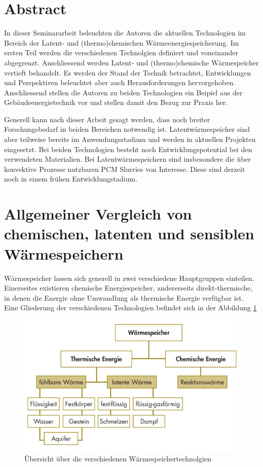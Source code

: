 \documentclass[11pt,a4paper]{scrartcl}
\begin{document}

\tableofcontents
\newpage
\renewcommand{\headrulewidth}{0.4pt}
\renewcommand{\footrulewidth}{0.4pt}
\lhead{}
\rhead{}
\cfoot{}
\setcounter{page}{1}
\cfoot{\thepage}
\section{Abstract}
In dieser Seminararbeit beleuchten die Autoren die aktuellen Technologien im
Bereich der Latent- und (thermo)chemischen Wärmeenergiespeicherung. Im ersten Teil
werden die verschiedenen Technolgien definiert und voneinander abgegrenzt.
Anschliessend werden Latent- und (thermo)chemische Wärmespeicher vertieft
behandelt. Es werden der Stand der Technik betrachtet, Entwicklungen und
Perspektiven beleuchtet aber auch Herausforderungen hervorgehoben. Anschliessend
stellen die Autoren zu beiden Technologien ein Beipiel aus der
Gebäudeenergietechnik vor und stellen damit den Bezug zur Praxis her. 

Generell kann nach dieser Arbeit gesagt werden, dass noch breiter
Forschungsbedarf in beiden Bereichen notwendig ist. Latentwärmespeicher sind aber teilweise bereits
im Anwendungsstadium und werden in aktuellen Projekten eingesetzt. Bei beiden
Technologien besteht noch Entwicklungspotential bei den verwendeten Materialien.
Bei Latentwärmespeichern sind insbesondere die über konvektive Prozesse
nutzbaren PCM Slurries von Interesse. Diese sind derzeit noch in einem frühen
Entwicklungstadium.

\newpage
\section{Allgemeiner Vergleich von chemischen, latenten und sensiblen
Wärmespeichern}
Wärmespeicher lassen sich generell in zwei verschiedene Hauptgruppen einteilen.
Einerseites existieren chemische Energiespeicher, andererseits
direkt-thermische, in denen die Energie ohne Umwandlung als thermische Energie
verfügbar ist. Eine Gliederung der verschiedenen Technologien befindet sich in
der Abbildung
\ref{fig:Wärmespeicher}

\begin{figure}[h]
\begin{center}
\includegraphics[scale=0.3]{images/speicher.jpg}
\caption{Übersicht über die verschiedenen Wärmespeichertechnolgien \cite{BINE1}}
\label{fig:Wärmespeicher}
\end{center}
\end{figure}
\end{document}
